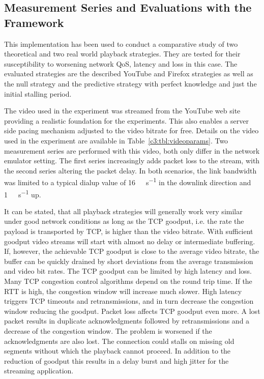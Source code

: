 \subsection{Measurement Series and Evaluations with the Framework}

This implementation has been used to conduct a comparative study of two theoretical and two real world playback strategies. They are tested for their susceptibility to worsening network \gls{QoS}, latency and loss in this case. The evaluated strategies are the described YouTube and Firefox strategies as well as the null strategy and the predictive strategy with perfect knowledge and just the initial stalling period.

The video used in the experiment was streamed from the YouTube web site providing a realistic foundation for the experiments. This also enables a server side pacing mechanism adjusted to the video bitrate for free.
Details on the video used in the experiment are available in Table~\ref{c3:tbl:videoparams}. Two measurement series are performed with this video, both only differ in the network emulator setting. The first series increasingly adds packet loss to the stream, with the second series altering the packet delay. In both scenarios, the link bandwidth was limited to a typical dialup value of \SI{16}{\mega\bit\per\second} in the downlink direction and \SI{1}{\mega\bit\per\second} up.

It can be stated, that all playback strategies will generally work very similar under good network conditions as long as the \gls{TCP} goodput, i.e. the rate the payload is transported by \gls{TCP}, is higher than the video bitrate. With sufficient goodput video streams will start with almost no delay or intermediate buffering. 
If, however, the achievable \gls{TCP} goodput is close to the average video bitrate, the buffer can be quickly drained by short deviations from the average transmission and video bit rates. The \gls{TCP} goodput can be limited by high latency and loss. Many \gls{TCP} congestion control algorithms depend on the round trip time. If the \gls{RTT} is high, the congestion window will increase much slower. High latency triggers \gls{TCP} timeouts and retransmissions, and in turn decrease the congestion window reducing the goodput. Packet loss affects \gls{TCP} goodput even more. A lost packet results in duplicate acknowledgments followed by retransmissions and a decrease of the congestion window. The problem is worsened if the acknowledgments are also lost. The connection could stalls on missing old segments without which the playback cannot proceed. In addition to the reduction of goodput this results in a delay burst and high jitter for the streaming application.


